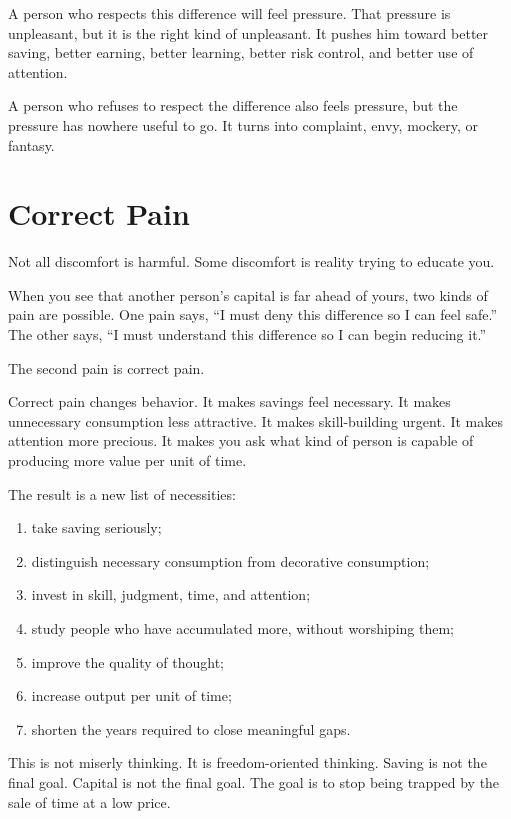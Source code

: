 A person who respects this difference will feel pressure. That pressure is unpleasant, but it is the right kind of unpleasant. It pushes him toward better saving, better earning, better learning, better risk control, and better use of attention.

A person who refuses to respect the difference also feels pressure, but the pressure has nowhere useful to go. It turns into complaint, envy, mockery, or fantasy.

\section*{Correct Pain}

Not all discomfort is harmful. Some discomfort is reality trying to educate you.

When you see that another person's capital is far ahead of yours, two kinds of pain are possible. One pain says, ``I must deny this difference so I can feel safe.'' The other says, ``I must understand this difference so I can begin reducing it.''

The second pain is correct pain.

Correct pain changes behavior. It makes savings feel necessary. It makes unnecessary consumption less attractive. It makes skill-building urgent. It makes attention more precious. It makes you ask what kind of person is capable of producing more value per unit of time.

The result is a new list of necessities:

\begin{enumerate}
\item take saving seriously;
\item distinguish necessary consumption from decorative consumption;
\item invest in skill, judgment, time, and attention;
\item study people who have accumulated more, without worshiping them;
\item improve the quality of thought;
\item increase output per unit of time;
\item shorten the years required to close meaningful gaps.
\end{enumerate}

This is not miserly thinking. It is freedom-oriented thinking. Saving is not the final goal. Capital is not the final goal. The goal is to stop being trapped by the sale of time at a low price.


